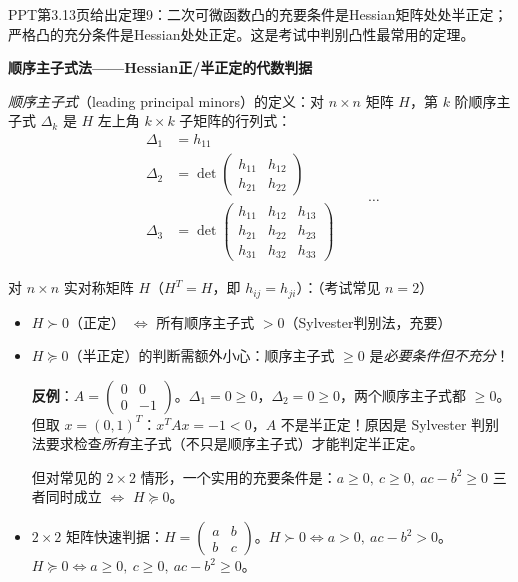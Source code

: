 \medskip
PPT第3.13页给出定理9：二次可微函数凸的充要条件是Hessian矩阵处处半正定；严格凸的充分条件是Hessian处处正定。这是考试中判别凸性最常用的定理。
\medskip
{}
\medskip

\begin{notebox}
\textbf{顺序主子式法——Hessian正/半正定的代数判据}

\emph{顺序主子式}（leading principal minors）的定义：对 $n\times n$ 矩阵 $H$，第 $k$ 阶顺序主子式 $\Delta_k$ 是 $H$ 左上角 $k\times k$ 子矩阵的行列式：
\[
\begin{aligned}
\Delta_1 &= h_{11} \\
\Delta_2 &= \det\begin{pmatrix}h_{11}&h_{12}\\h_{21}&h_{22}\end{pmatrix} \\
\Delta_3 &= \det\begin{pmatrix}h_{11}&h_{12}&h_{13}\\h_{21}&h_{22}&h_{23}\\h_{31}&h_{32}&h_{33}\end{pmatrix}
\end{aligned}
\qquad\dots
\]

对 $n\times n$ 实对称矩阵 $H$（$H^T=H$，即 $h_{ij}=h_{ji}$）：（考试常见 $n=2$）
\begin{itemize}
  \item $H \succ 0$（正定） $\Longleftrightarrow$ 所有顺序主子式 $> 0$（Sylvester判别法，充要）
  \item $H \succeq 0$（半正定）的判断需额外小心：顺序主子式 $\ge 0$ 是\emph{必要条件但不充分}！

  \textbf{反例}：$A=\begin{pmatrix}0&0\\0&-1\end{pmatrix}$。$\Delta_1=0\ge0$，$\Delta_2=0\ge0$，两个顺序主子式都 $\ge0$。但取 $x=(0,1)^T$：$x^T A x = -1 < 0$，$A$ 不是半正定！原因是 Sylvester 判别法要求检查\emph{所有}主子式（不只是顺序主子式）才能判定半正定。

  但对常见的 $2\times2$ 情形，一个实用的充要条件是：$a\ge0,\ c\ge0,\ ac-b^2\ge0$ 三者同时成立 $\Longleftrightarrow$ $H\succeq0$。
  \item $2\times2$ 矩阵快速判据：$H=\begin{pmatrix}a&b\\b&c\end{pmatrix}$。$H\succ0 \Longleftrightarrow a>0,\ ac-b^2>0$。$H\succeq0 \Longleftrightarrow a\ge0,\ c\ge0,\ ac-b^2\ge0$。
\end{itemize}
\end{notebox}


